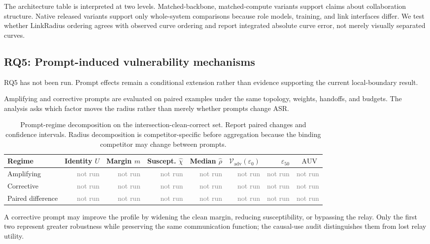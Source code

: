 \documentclass[11pt]{article}
\DeclareMathOperator{\AUV}{AUV}
\newcommand{\eps}{\varepsilon}
\newcommand{\Vuln}{\mathcal V}
\newcommand{\NotRun}{\textcolor{gray}{not run}}
\begin{document}
The architecture table is interpreted at two levels. Matched-backbone,
matched-compute variants support claims about collaboration structure. Native
released variants support only whole-system comparisons because role models,
training, and link interfaces differ. We test whether LinkRadius ordering
agrees with observed curve ordering and report integrated absolute curve error,
not merely visually separated curves.

\subsection{RQ5: Prompt-induced vulnerability mechanisms}

RQ5 has not been run. Prompt effects remain a conditional extension rather
than evidence supporting the current local-boundary result.

Amplifying and corrective prompts are evaluated on paired examples under the
same topology, weights, handoffs, and budgets. The analysis asks which factor
moves the radius rather than merely whether prompts change ASR.

\begin{table}[t]
\centering
\small
\setlength{\tabcolsep}{3.3pt}
\caption{Prompt-regime decomposition on the intersection-clean-correct set.
Report paired changes and confidence intervals. Radius decomposition is
competitor-specific before aggregation because the binding competitor may
change between prompts.}
\label{tab:prompt-decomposition}
\begin{tabular}{lrrrrrrr}
\toprule
Regime & Identity $U$ & Margin $m$ & Suscept. $\widehat\chi$ &
Median $\widehat\rho$ & $\Vuln_{\mathrm{adv}}(\eps_0)$ & $\eps_{50}$ & $\AUV$ \\
\midrule
Amplifying & \NotRun & \NotRun & \NotRun & \NotRun & \NotRun & \NotRun & \NotRun \\
Corrective & \NotRun & \NotRun & \NotRun & \NotRun & \NotRun & \NotRun & \NotRun \\
Paired difference & \NotRun & \NotRun & \NotRun & \NotRun & \NotRun & \NotRun & \NotRun \\
\bottomrule
\end{tabular}
\end{table}

A corrective prompt may improve the profile by widening the clean margin,
reducing susceptibility, or bypassing the relay. Only the first two represent
greater robustness while preserving the same communication function; the
causal-use audit distinguishes them from lost relay utility.
\end{document}
